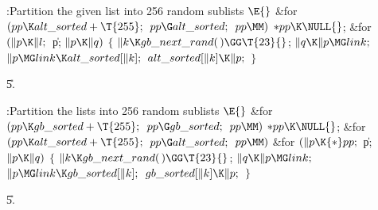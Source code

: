 \B{}:Partition the given list into 256 random sublists \X${}\E{}$\6
\&{for} ${}(\\{pp}\K\\{alt\_sorted}+\T{255};{}$ ${}\\{pp}\G\\{alt\_sorted};{}$
${}\\{pp}\MM){}$\1\5
${}{*}\\{pp}\K\NULL{}$;\2\6
\&{for} ${}(\|p\K\|l;{}$ \|p; ${}\|p\K\|q){}$\5
${}\{{}$\1\6
${}\|k\K\\{gb\_next\_rand}(\,)\GG\T{23}{}$;\6
${}\|q\K\|p\MG\\{link};{}$\6
${}\|p\MG\\{link}\K\\{alt\_sorted}[\|k];{}$\6
${}\\{alt\_sorted}[\|k]\K\|p;{}$\6
\4${}\}{}$\2\par
\U5.\fi

\B{}:Partition the  lists into 256 random sublists %
\X${}\E{}$\6
\&{for} ${}(\\{pp}\K\\{gb\_sorted}+\T{255};{}$ ${}\\{pp}\G\\{gb\_sorted};{}$
${}\\{pp}\MM){}$\1\5
${}{*}\\{pp}\K\NULL{}$;\2\6
\&{for} ${}(\\{pp}\K\\{alt\_sorted}+\T{255};{}$ ${}\\{pp}\G\\{alt\_sorted};{}$
${}\\{pp}\MM){}$\1\6
\&{for} ${}(\|p\K{*}\\{pp};{}$ \|p; ${}\|p\K\|q){}$\5
${}\{{}$\1\6
${}\|k\K\\{gb\_next\_rand}(\,)\GG\T{23}{}$;\6
${}\|q\K\|p\MG\\{link};{}$\6
${}\|p\MG\\{link}\K\\{gb\_sorted}[\|k];{}$\6
${}\\{gb\_sorted}[\|k]\K\|p;{}$\6
\4${}\}{}$\2\2\par
\U5.\fi


